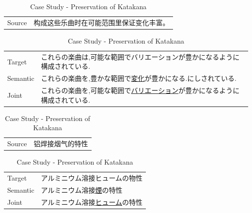 \vspace{0.4cm}
\begin{table}[h]
    \centering

    \begin{CJK}{UTF8}{gbsn}
        \begin{tabularx}{\textwidth}{p{1.2cm}b}\toprule
            Source & 构成这些乐曲时在可能范围里保证变化丰富。 \\
        \end{tabularx}
    \end{CJK}

    \begin{CJK}{UTF8}{long}
        \begin{tabularx}{\textwidth}{p{1.2cm}b}
            Target & これらの楽曲は,可能な範囲でバリエーションが豊かになるように構成されている. \\
            Semantic & これらの楽曲を,豊かな範囲で\underline{変化}が豊かになる.にしされている. \\
            Joint & これらの楽曲を,可能な範囲で\underline{バリエーション}が豊かになるように構成されている. \\\midrule
        \end{tabularx}
    \end{CJK}

    \begin{CJK}{UTF8}{gbsn}
        \begin{tabularx}{\textwidth}{p{1.2cm}b}
            Source & 铝焊接烟气的特性 \\
        \end{tabularx}
    \end{CJK}

    \begin{CJK}{UTF8}{long}
        \begin{tabularx}{\textwidth}{p{1.2cm}b}
            Target & アルミニウム溶接ヒュームの物性 \\
            Semantic & アルミニウム溶接\underline{煙}の特性 \\
            Joint & アルミニウム溶接\underline{ヒューム}の特性 \\\midrule
        \end{tabularx}
    \end{CJK}
    \caption{Case Study - Preservation of Katakana}
    \label{tab:case_study2}
\end{table}

